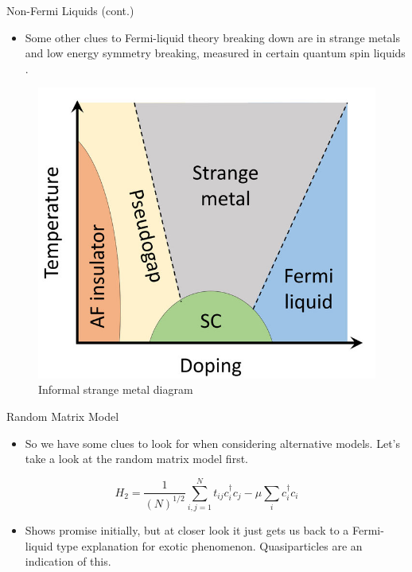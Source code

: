 \documentclass{beamer}
\begin{document}
\begin{frame}{Non-Fermi Liquids (cont.)}
\begin{itemize}
    \item Some other clues to Fermi-liquid theory breaking down are in strange metals and low energy symmetry breaking, measured in certain quantum spin liquids \cite{Tatsumi_2009}.
\end{itemize}
\begin{figure}
    \centering
    \includegraphics[scale = 0.2]{Strange Metal.jpeg}
    \caption{Informal strange metal diagram}
    \label{fig:enter-label}
\end{figure}
    
\end{frame}
\begin{frame}{Random Matrix Model}
\begin{itemize}
    \item So we have some clues to look for when considering alternative models. Let's take a look at the random matrix model first.
\end{itemize}
\begin{equation}
    H_{2} = \frac{1}{(N)^{1/2}}\sum_{i,j =1}^{N} t_{ij}c_{i}^{\dagger}c_{j} -  \mu \sum_{i}c_{i}^{\dagger}c_{i}
\end{equation}
\begin{itemize}
    \item Shows promise initially, but at closer look it just gets us back to a Fermi-liquid type explanation for exotic phenomenon. Quasiparticles are an indication of this.
\end{itemize}

\end{frame}
\end{document}
